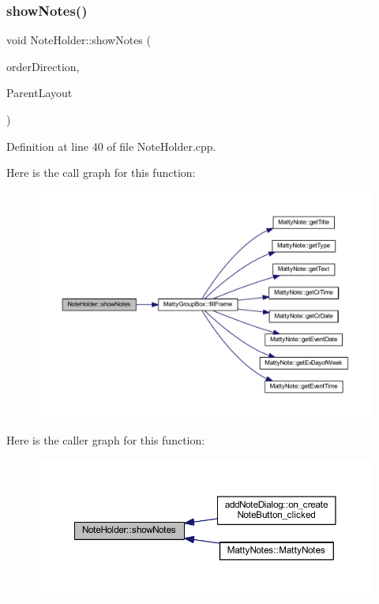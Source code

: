 \subsubsection{\texorpdfstring{show\+Notes()}{showNotes()}}
{\footnotesize\ttfamily void Note\+Holder\+::show\+Notes (\begin{DoxyParamCaption}\item[{int}]{order\+Direction,  }\item[{Q\+V\+Box\+Layout $\ast$}]{Parent\+Layout }\end{DoxyParamCaption})\hspace{0.3cm}{\ttfamily [static]}}



Definition at line 40 of file Note\+Holder.\+cpp.

Here is the call graph for this function\+:
\nopagebreak
\begin{figure}[H]
\begin{center}
\leavevmode
\includegraphics[width=350pt]{classNoteHolder_a9fbdbdf5cc2628f360c45eb861eacded_cgraph}
\end{center}
\end{figure}
Here is the caller graph for this function\+:
\nopagebreak
\begin{figure}[H]
\begin{center}
\leavevmode
\includegraphics[width=350pt]{classNoteHolder_a9fbdbdf5cc2628f360c45eb861eacded_icgraph}
\end{center}
\end{figure}
\hypertarget{classNoteHolder_ab52d375cf5ab24f0512fab6308ec8b25}{}\label{classNoteHolder_ab52d375cf5ab24f0512fab6308ec8b25} 
